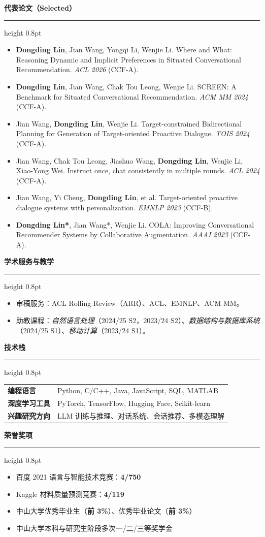 \documentclass[11pt,a4paper,fontset=fandol]{ctexart}
\newcommand{\Section}[1]{%
    \vspace{0.50em}
    {\color{Accent}\bfseries\large #1}\par
    \vspace{0.26em}
    {\color{RuleGray}\hrule height 0.8pt}
    \vspace{0.42em}
}
\begin{document}
\Section{代表论文（Selected）}
\begin{itemize}
    \item \textbf{Dongding Lin}, Jian Wang, Yongqi Li, Wenjie Li. Where and What: Reasoning Dynamic and Implicit Preferences in Situated Conversational Recommendation. \textit{ACL 2026} (CCF-A).
    \item \textbf{Dongding Lin}, Jian Wang, Chak Tou Leong, Wenjie Li. SCREEN: A Benchmark for Situated Conversational Recommendation. \textit{ACM MM 2024} (CCF-A).
    \item Jian Wang, \textbf{Dongding Lin}, Wenjie Li. Target-constrained Bidirectional Planning for Generation of Target-oriented Proactive Dialogue. \textit{TOIS 2024} (CCF-A).
    \item Jian Wang, Chak Tou Leong, Jiashuo Wang, \textbf{Dongding Lin}, Wenjie Li, Xiao-Yong Wei. Instruct once, chat consistently in multiple rounds. \textit{ACL 2024} (CCF-A).
    \item Jian Wang, Yi Cheng, \textbf{Dongding Lin}, et al. Target-oriented proactive dialogue systems with personalization. \textit{EMNLP 2023} (CCF-B).
    \item \textbf{Dongding Lin*}, Jian Wang*, Wenjie Li. COLA: Improving Conversational Recommender Systems by Collaborative Augmentation. \textit{AAAI 2023} (CCF-A).
\end{itemize}

\Section{学术服务与教学}
\begin{itemize}
    \item 审稿服务：ACL Rolling Review（ARR）、ACL、EMNLP、ACM MM。
    \item 助教课程：\textit{自然语言处理}（2024/25 S2，2023/24 S2）、\textit{数据结构与数据库系统}（2024/25 S1）、\textit{移动计算}（2023/24 S1）。
\end{itemize}

\Section{技术栈}
\begin{tabularx}{\linewidth}{@{}>{\bfseries}p{2.9cm}X@{}}
编程语言 & Python, C/C++, Java, JavaScript, SQL, MATLAB \\
深度学习工具 & PyTorch, TensorFlow, Hugging Face, Scikit-learn \\
兴趣研究方向 & LLM 训练与推理、对话系统、会话推荐、多模态理解
\end{tabularx}

\Section{荣誉奖项}
\begin{itemize}
    \item 百度 2021 语言与智能技术竞赛：\textbf{4/750}
    \item Kaggle 材料质量预测竞赛：\textbf{4/119}
    \item 中山大学优秀毕业生（\textbf{前 3\%}）、优秀毕业论文（\textbf{前 3\%}）
    \item 中山大学本科与研究生阶段多次一/二/三等奖学金
\end{itemize}
\end{document}
